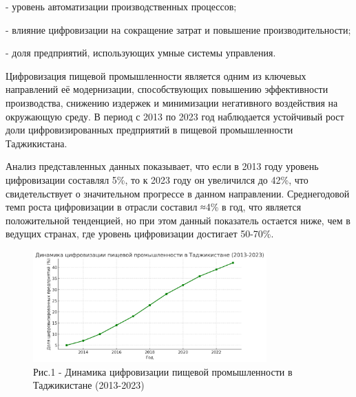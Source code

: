\begin{multicols}{2}
- уровень автоматизации производственных процессов;

- влияние цифровизации на сокращение затрат и повышение
производительности;

- доля предприятий, использующих умные системы управления.

Цифровизация пищевой промышленности является одним из ключевых
направлений её модернизации, способствующих повышению эффективности
производства, снижению издержек и минимизации негативного воздействия на
окружающую среду. В период с 2013 по 2023 год наблюдается устойчивый
рост доли цифровизированных предприятий в пищевой промышленности
Таджикистана.

Анализ представленных данных показывает, что если в 2013 году уровень
цифровизации составлял 5\%, то к 2023 году он увеличился до 42\%, что
свидетельствует о значительном прогрессе в данном направлении.
Среднегодовой темп роста цифровизации в отрасли составил ≈4\% в год, что
является положительной тенденцией, но при этом данный показатель
остается ниже, чем в ведущих странах, где уровень цифровизации достигает
50-70\%.
\end{multicols}

\begin{figure}[H]
	\centering
	\includegraphics[width=0.8\textwidth]{media/ekon2/image48}
	\caption*{Рис.1 - Динамика цифровизации пищевой промышленности в Таджикистане (2013-2023)}
\end{figure}


